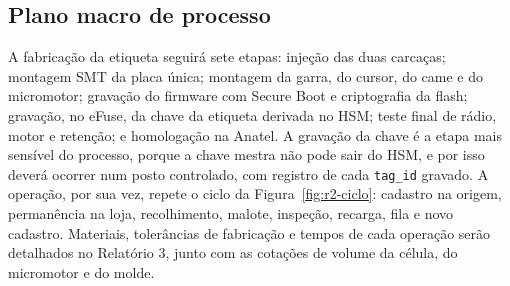 \subsection{Plano macro de processo}

A fabricação da etiqueta seguirá sete etapas: injeção das duas carcaças; montagem SMT da placa única; montagem da garra, do cursor, do came e do micromotor; gravação do firmware com Secure Boot e criptografia da flash; gravação, no eFuse, da chave da etiqueta derivada no HSM; teste final de rádio, motor e retenção; e homologação na Anatel. A gravação da chave é a etapa mais sensível do processo, porque a chave mestra não pode sair do HSM, e por isso deverá ocorrer num posto controlado, com registro de cada \texttt{tag\_id} gravado. A operação, por sua vez, repete o ciclo da Figura~\ref{fig:r2-ciclo}: cadastro na origem, permanência na loja, recolhimento, malote, inspeção, recarga, fila e novo cadastro. Materiais, tolerâncias de fabricação e tempos de cada operação serão detalhados no Relatório 3, junto com as cotações de volume da célula, do micromotor e do molde.
